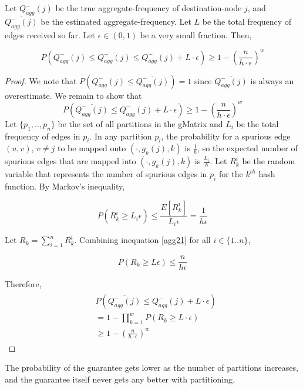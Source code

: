 \begin{theorem}
\label{thm:agg2}
  Let $Q_{agg}^{-}(j)$ be the true aggregate-frequency of destination-node $j$, and $\overline{Q_{agg}^{-}(j)}$ be the estimated aggregate-frequency. Let $L$ be the total frequency of edges received so far. Let $\epsilon \in (0,1)$ be a very small fraction. Then,
  
  \[
P(Q_{agg}^{-}(j) \leq \overline{Q_{agg}^{-}(j)} \leq Q_{agg}^{-}(j) + L \cdot \epsilon) \geq 1-(\frac{n}{h\cdot\epsilon})^w
\]

\end{theorem}

\begin{proof}
We note that $P(Q_{agg}^{-}(j) \leq \overline{Q_{agg}^{-}(j)}) = 1$ since $\overline{Q_{agg}^{-}(j)}$ is always an overestimate. We remain to show that
\[
P(\overline{Q_{agg}^{-}(j)} \leq Q_{agg}^{-}(j) + L \cdot \epsilon) \geq 1-(\frac{n}{h\cdot\epsilon})^w
\]
Let $\{p_1,..,p_n\}$ be the set of all partitions in the gMatrix and $L_i$ be the total frequency of edges in $p_i$. In any partition $p_i$, the probability for a spurious edge $(u,v)$, $v \neq j$ to be mapped onto $(\cdot,g_k(j),k)$ is $\frac{1}{h}$, so the expected number of spurious edges that are mapped into $(\cdot,g_k(j),k)$ is $\frac{L_i}{h}$. Let $R_k^i$ be the random variable that represents the number of spurious edges in $p_i$ for the $k^{th}$ hash function. By Markov's inequality,

\begin{equation} \label{agg21}
  P(R_k^i \geq L_i \epsilon) \leq \frac{E[R_k^i]}{L_i \epsilon} = \frac{1}{h\epsilon}
\end{equation}

Let $R_k = \sum_{i=1}^{n} R_k^i$. Combining inequation \ref{agg21} for all $i \in \{1..n\}$, 

\begin{equation} \label{agg22}
 P(R_k \geq L\epsilon) \leq \frac{n}{h\epsilon}
\end{equation}

Therefore,
\begin{align}
\begin{split}
&  P(\overline{Q_{agg}^{-}(j)} \leq Q_{agg}^{-}(j) + L \cdot \epsilon)
\\  &= 1 - \prod _{k=1}^{w}P(R_k \geq L \cdot \epsilon)
\\  &\geq 1-(\frac{n}{h\cdot\epsilon})^w
\end{split}
\end{align}

\end{proof}

\begin{remarks}
The probability of the guarantee gets lower as the number of partitions increases, and the guarantee itself never gets any better with partitioning.
\end{remarks}
